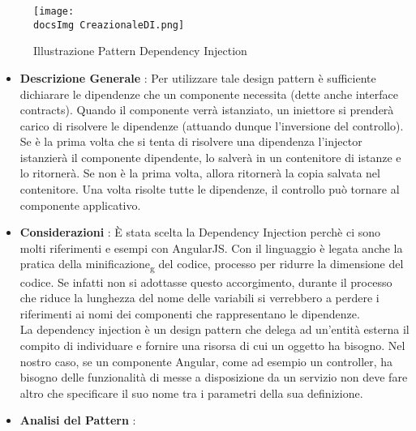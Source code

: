{{{			\begin{figure}[h]
				\centering
				\texttt{[image: \\docsImg CreazionaleDI.png]}
				\caption{Illustrazione Pattern Dependency Injection}
				\label{Illustrazione Pattern Dependency Injection}
			\end{figure}
		
			\begin{itemize}\itemsep1pt
				\item \textbf{Descrizione Generale} : Per utilizzare tale design pattern è sufficiente dichiarare le dipendenze che un componente necessita (dette anche interface contracts). Quando il componente verrà istanziato, un iniettore si prenderà carico di risolvere le dipendenze (attuando dunque l'inversione del controllo). Se è la prima volta che si tenta di risolvere una dipendenza l'injector istanzierà il componente dipendente, lo salverà in un contenitore di istanze e lo ritornerà. Se non è la prima volta, allora ritornerà la copia salvata nel contenitore. Una volta risolte tutte le dipendenze, il controllo può tornare al componente applicativo.
				\item \textbf{Considerazioni} : È stata scelta la Dependency Injection perchè ci sono molti riferimenti e esempi con AngularJS. Con il linguaggio è legata anche la pratica della minificazione\textsubscript{g} del codice, processo per ridurre la dimensione del codice. Se infatti non si adottasse questo accorgimento, durante il processo che riduce la lunghezza del nome delle variabili si verrebbero a perdere i riferimenti ai nomi dei componenti che rappresentano le dipendenze.\\
				La dependency injection è un design pattern che delega ad un’entità esterna il compito di individuare e fornire una risorsa di cui un oggetto ha bisogno. Nel nostro caso, se un componente Angular, come ad esempio un controller, ha bisogno delle funzionalità di messe a disposizione da un servizio non deve fare altro che specificare il suo nome tra i parametri della sua definizione.
				\item \textbf{Analisi del Pattern} : \hfill
				

\end{itemize}}}}
